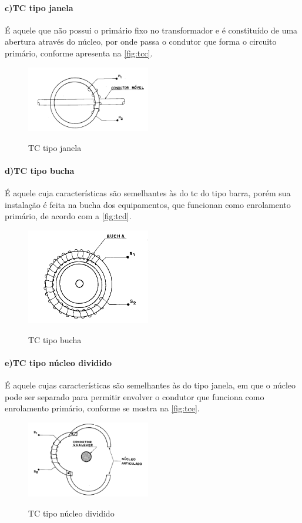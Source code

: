 \documentclass[a5paper,english,spanish,brazil]{ufsc-thesis}
\begin{document}
				\paragraph*{c)\indent TC tipo janela}
					É aquele que não possui o primário fixo no transformador e é constituído de uma abertura através do núcleo, por onde passa o condutor que forma o circuito primário, conforme apresenta na \autoref{fig:tcc}.
					\begin{figure}[htb]
						\caption{TC tipo janela}
						\centering
						\includegraphics[width=5.4cm]{TC(3).png}
						\label{fig:tcc}
					\end{figure}
				\paragraph*{d)\indent TC tipo bucha}
					É aquele cuja características são semelhantes às do tc do tipo barra, porém sua instalação é feita na bucha dos equipamentos, que funcionan como enrolamento primário, de acordo com a \autoref{fig:tcd}.
					\begin{figure}[htb]
						\caption{TC tipo bucha}
						\centering
						\includegraphics[width=5.4cm]{TC(4).png}
						\label{fig:tcd}
					\end{figure}
				\paragraph*{e)\indent TC tipo núcleo dividido}
					É aquele cujas características são semelhantes às do tipo janela, em que o núcleo pode ser separado para permitir envolver o condutor que funciona como enrolamento primário, conforme se mostra na \autoref{fig:tce}.
					\begin{figure}[htb]
						\caption{TC tipo núcleo dividido}
						\centering
						\includegraphics[width=5.4cm]{TC(5).png}
						\label{fig:tce}
					\end{figure}
\end{document}
